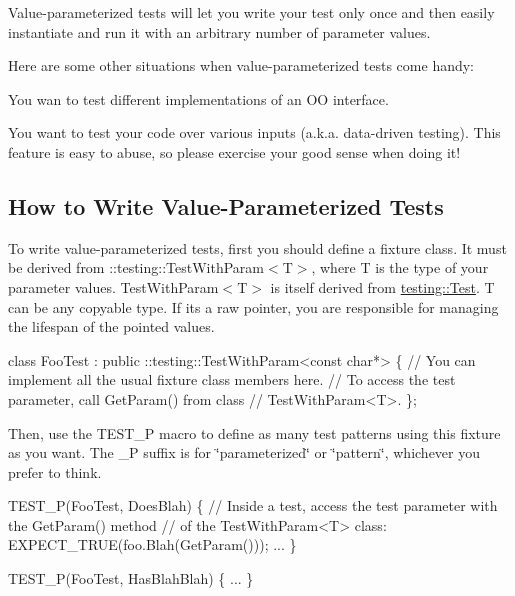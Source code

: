 Value-\/parameterized tests will let you write your test only once and then easily instantiate and run it with an arbitrary number of parameter values.

Here are some other situations when value-\/parameterized tests come handy\+:


\begin{DoxyItemize}
\item You wan to test different implementations of an OO interface.
\item You want to test your code over various inputs (a.\+k.\+a. data-\/driven testing). This feature is easy to abuse, so please exercise your good sense when doing it!
\end{DoxyItemize}

\subsection*{How to Write Value-\/\+Parameterized Tests}

To write value-\/parameterized tests, first you should define a fixture class. It must be derived from {\ttfamily \+::testing\+::\+Test\+With\+Param$<$T$>$}, where {\ttfamily T} is the type of your parameter values. {\ttfamily Test\+With\+Param$<$T$>$} is itself derived from {\ttfamily \hyperlink{classtesting_1_1_test}{testing\+::\+Test}}. {\ttfamily T} can be any copyable type. If it\textquotesingle{}s a raw pointer, you are responsible for managing the lifespan of the pointed values.


\begin{DoxyCode}
class FooTest : public ::testing::TestWithParam<const char*> \{
  // You can implement all the usual fixture class members here.
  // To access the test parameter, call GetParam() from class
  // TestWithParam<T>.
\};
\end{DoxyCode}


Then, use the {\ttfamily T\+E\+S\+T\+\_\+P} macro to define as many test patterns using this fixture as you want. The {\ttfamily \+\_\+P} suffix is for \char`\"{}parameterized\char`\"{} or \char`\"{}pattern\char`\"{}, whichever you prefer to think.


\begin{DoxyCode}
TEST\_P(FooTest, DoesBlah) \{
  // Inside a test, access the test parameter with the GetParam() method
  // of the TestWithParam<T> class:
  EXPECT\_TRUE(foo.Blah(GetParam()));
  ...
\}

TEST\_P(FooTest, HasBlahBlah) \{
  ...
\}
\end{DoxyCode}


